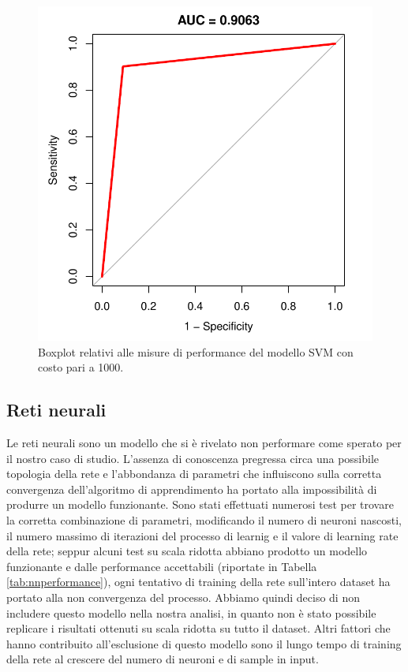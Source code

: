 \begin{figure}
	\centering
	\includegraphics[width=0.7\linewidth]{../FinalResults/Images/svm1000/auc.pdf}
	\caption{Boxplot relativi alle misure di performance del modello SVM con costo pari a 1000.}
	\label{fig:svm1000performance}
\end{figure}

\subsection{Reti neurali}
Le reti neurali sono un modello che si è rivelato non performare come sperato per il nostro caso di studio. L'assenza di conoscenza pregressa circa una possibile topologia della rete e l'abbondanza di parametri che influiscono sulla corretta convergenza dell'algoritmo di apprendimento ha portato alla impossibilità di produrre un modello funzionante. Sono stati effettuati numerosi test per trovare la corretta combinazione di parametri, modificando il numero di neuroni nascosti, il numero massimo di iterazioni del processo di learnig e il valore di learning rate della rete; seppur alcuni test su scala ridotta abbiano prodotto un modello funzionante e dalle performance accettabili (riportate in Tabella \ref{tab:nnperformance}), ogni tentativo di training della rete sull'intero dataset ha portato alla non convergenza del processo. Abbiamo quindi deciso di non includere questo modello nella nostra analisi, in quanto non è stato possibile replicare i risultati ottenuti su scala ridotta su tutto il dataset. Altri fattori che hanno contribuito all'esclusione di questo modello sono il lungo tempo di training della rete al crescere del numero di neuroni e di sample in input.

